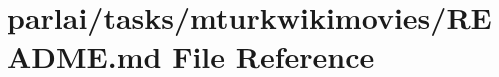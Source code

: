 \hypertarget{parlai_2tasks_2mturkwikimovies_2README_8md}{}\section{parlai/tasks/mturkwikimovies/\+R\+E\+A\+D\+ME.md File Reference}
\label{parlai_2tasks_2mturkwikimovies_2README_8md}
